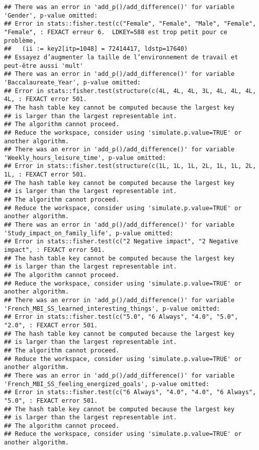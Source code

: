 \documentclass[
]{article}
\begin{document}
\begin{verbatim}
## There was an error in 'add_p()/add_difference()' for variable 'Gender', p-value omitted:
## Error in stats::fisher.test(c("Female", "Female", "Male", "Female", "Female", : FEXACT erreur 6.  LDKEY=588 est trop petit pour ce problème,
##   (ii := key2[itp=1048] = 72414417, ldstp=17640)
## Essayez d’augmenter la taille de l’environnement de travail et peut-être aussi 'mult'
## There was an error in 'add_p()/add_difference()' for variable 'Baccalaureate_Year', p-value omitted:
## Error in stats::fisher.test(structure(c(4L, 4L, 4L, 3L, 4L, 4L, 4L, 4L, : FEXACT error 501.
## The hash table key cannot be computed because the largest key
## is larger than the largest representable int.
## The algorithm cannot proceed.
## Reduce the workspace, consider using 'simulate.p.value=TRUE' or another algorithm.
## There was an error in 'add_p()/add_difference()' for variable 'Weekly_hours_leisure_time', p-value omitted:
## Error in stats::fisher.test(structure(c(1L, 1L, 1L, 2L, 1L, 1L, 2L, 1L, : FEXACT error 501.
## The hash table key cannot be computed because the largest key
## is larger than the largest representable int.
## The algorithm cannot proceed.
## Reduce the workspace, consider using 'simulate.p.value=TRUE' or another algorithm.
## There was an error in 'add_p()/add_difference()' for variable 'Study_impact_on_family_life', p-value omitted:
## Error in stats::fisher.test(c("2 Negative impact", "2 Negative impact", : FEXACT error 501.
## The hash table key cannot be computed because the largest key
## is larger than the largest representable int.
## The algorithm cannot proceed.
## Reduce the workspace, consider using 'simulate.p.value=TRUE' or another algorithm.
## There was an error in 'add_p()/add_difference()' for variable 'French_MBI_SS_learned_interesting_things', p-value omitted:
## Error in stats::fisher.test(c("5.0", "6 Always", "4.0", "5.0", "2.0", : FEXACT error 501.
## The hash table key cannot be computed because the largest key
## is larger than the largest representable int.
## The algorithm cannot proceed.
## Reduce the workspace, consider using 'simulate.p.value=TRUE' or another algorithm.
## There was an error in 'add_p()/add_difference()' for variable 'French_MBI_SS_feeling_energized_goals', p-value omitted:
## Error in stats::fisher.test(c("6 Always", "4.0", "4.0", "6 Always", "5.0", : FEXACT error 501.
## The hash table key cannot be computed because the largest key
## is larger than the largest representable int.
## The algorithm cannot proceed.
## Reduce the workspace, consider using 'simulate.p.value=TRUE' or another algorithm.

\end{verbatim}
\end{document}
